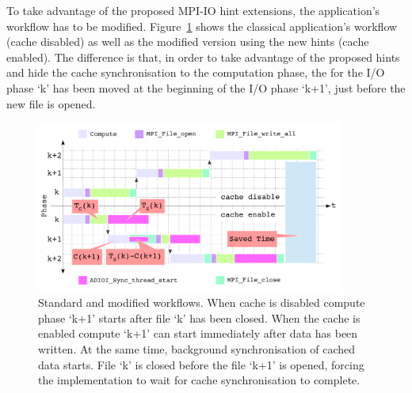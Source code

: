 To take advantage of the proposed MPI-IO hint extensions, the application's workflow has to be modified. Figure~\ref{figure: workflow3} shows the classical application's workflow (cache disabled) as well as the modified version using the new hints (cache enabled). The difference is that, in order to take advantage of the proposed hints and hide the cache synchronisation to the computation phase, the  for the I/O phase `k' has been moved at the beginning of the I/O phase `k+1', just before the new file is opened.
\begin{figure}[!htb]
  \centering
  \includegraphics[width=0.9\textwidth]{chapters/chapter3/figures/workflow}
  \caption{Standard and modified workflows. When cache is disabled compute phase `k+1' starts after file `k' has been closed. When the cache is enabled compute `k+1' can start immediately after data has been written. At the same time, background synchronisation of cached data starts. File `k' is closed before the file `k+1' is opened, forcing the implementation to wait for cache synchronisation to complete.}
  \label{figure: workflow3}
\end{figure}

